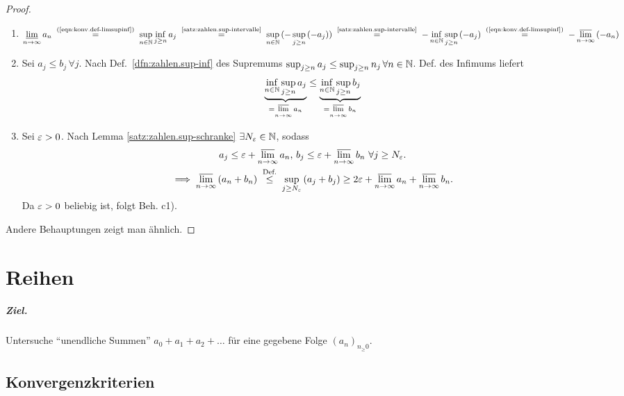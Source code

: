 \documentclass[12pt]{scrreprt}
\begin{document}
\begin{proof}
  \begin{enumerate}
  \item \[ \li_{\ninf}{a_n} \nach{=}{(\ref{eqn:konv.def-limsupinf})}
    \sup_{\nat{n}}{\inf_{j\ge n}{a_j}}
    \nach{=}{\ref{satz:zahlen.sup-intervalle}}
    \sup_{\nat{n}}{(-\sup_{j\ge n}{(-a_j)})}
    \nach{=}{\ref{satz:zahlen.sup-intervalle}}
    -\inf_{\nat{n}}{\sup_{j\ge n}{(-a_j)}}
    \nach{=}{(\ref{eqn:konv.def-limsupinf})}
    -\ls_{\ninf}{(-a_n)} \]
  \item Sei $a_j\le b_j\,\forall j$. Nach
    Def.~\ref{dfn:zahlen.sup-inf} des Supremums $\sup_{j\ge n}{a_j}
    \le \sup_{j\ge n}{n_j}\,\forall n\in\mathbb{N}$. Def. des Infimums liefert
    \[\underbrace{\inf_{n\in\mathbb{N}}{\sup_{j\ge n}{a_j}}}_{=\varlimsup\limits_{n\rightarrow\infty}{a_n}}
    \le \underbrace{\inf_{n\in\mathbb{N}}{\sup_{j\ge n}{b_j}}}_{=\varlimsup\limits_{n\rightarrow\infty}{b_n}} \]
  \item Sei $\varepsilon>0$. Nach Lemma \ref{satz:zahlen.sup-schranke}
    $\exists N_\varepsilon\in\mathbb{N}$, sodass
    \begin{gather*}
      a_j\le\ep+\ls_{\ninf}{a_n} \text{, }
      b_j\le\ep+\ls_{\ninf}{b_n}\ \forall j\ge N_\ep.\\
      \folgt \ls_{\ninf}{(a_n+b_n)} \nach{\le}{Def.} \sup_{j\ge
        N_\ep}{(a_j+b_j)} \ge 2\ep + \ls_{\ninf}{a_n} +
      \ls_{\ninf}{b_n}.
    \end{gather*}
    Da $\varepsilon>0$ beliebig ist, folgt Beh. c1).
  \end{enumerate}
  Andere Behauptungen zeigt man ähnlich.
\end{proof}


\chapter{Reihen}

\paragraph{Ziel.} Untersuche "`unendliche Summen"'
$a_0+a_1+a_2+\dotsc$ für eine gegebene Folge $(a_n)_{n_\ge0}$.

\section{Konvergenzkriterien}
\label{sec:reihen.konvkrit}


\begin{dfn}
  \label{dfn:reihen.reihe}
\end{dfn}
\end{document}
